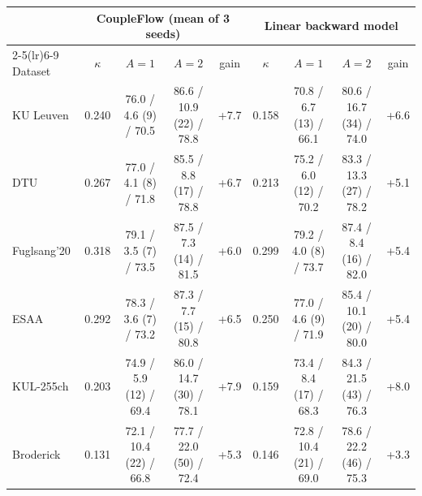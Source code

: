 \begin{tabular}{lcccccccc}\toprule
& \multicolumn{4}{c}{CoupleFlow (mean of 3 seeds)} & \multicolumn{4}{c}{Linear backward model} \\
\cmidrule(lr){2-5}\cmidrule(lr){6-9}
Dataset & $\kappa$ & $A{=}1$ & $A{=}2$ & gain & $\kappa$ & $A{=}1$ & $A{=}2$ & gain \\\midrule
KU Leuven & 0.240 & 76.0 / 4.6 (9) / 70.5 & 86.6 / 10.9 (22) / 78.8 & +7.7 & 0.158 & 70.8 / 6.7 (13) / 66.1 & 80.6 / 16.7 (34) / 74.0 & +6.6 \\
DTU & 0.267 & 77.0 / 4.1 (8) / 71.8 & 85.5 / 8.8 (17) / 78.8 & +6.7 & 0.213 & 75.2 / 6.0 (12) / 70.2 & 83.3 / 13.3 (27) / 78.2 & +5.1 \\
Fuglsang'20 & 0.318 & 79.1 / 3.5 (7) / 73.5 & 87.5 / 7.3 (14) / 81.5 & +6.0 & 0.299 & 79.2 / 4.0 (8) / 73.7 & 87.4 / 8.4 (16) / 82.0 & +5.4 \\
ESAA & 0.292 & 78.3 / 3.6 (7) / 73.2 & 87.3 / 7.7 (15) / 80.8 & +6.5 & 0.250 & 77.0 / 4.6 (9) / 71.9 & 85.4 / 10.1 (20) / 80.0 & +5.4 \\
KUL-255ch & 0.203 & 74.9 / 5.9 (12) / 69.4 & 86.0 / 14.7 (30) / 78.1 & +7.9 & 0.159 & 73.4 / 8.4 (17) / 68.3 & 84.3 / 21.5 (43) / 76.3 & +8.0 \\
Broderick & 0.131 & 72.1 / 10.4 (22) / 66.8 & 77.7 / 22.0 (50) / 72.4 & +5.3 & 0.146 & 72.8 / 10.4 (21) / 69.0 & 78.6 / 22.2 (46) / 75.3 & +3.3 \\
\bottomrule\end{tabular}
